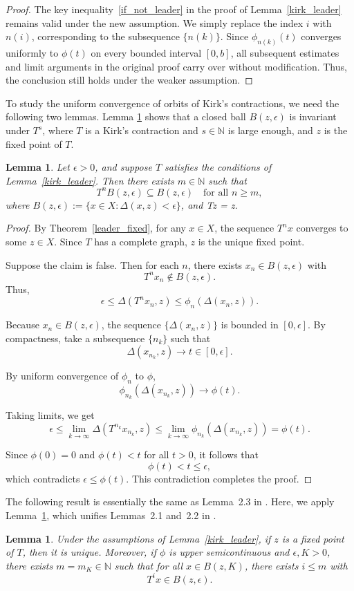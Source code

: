 \documentclass{birkjour}
\newtheorem{lem}[thm]{Lemma}
\theoremstyle{definition}
\theoremstyle{remark}
\numberwithin{equation}{section}
\begin{document}
\begin{proof}
The key inequality~\eqref{if_not_leader} in the proof of Lemma~\ref{kirk_leader} remains valid under the new assumption. We simply replace the index \(i\) with \(n(i)\), corresponding to the subsequence \(\{n(k)\}\). Since \(\phi_{n(k)}(t)\) converges uniformly to \(\phi(t)\) on every bounded interval \([0, b]\), all subsequent estimates and limit arguments in the original proof carry over without modification. Thus, the conclusion still holds under the weaker assumption.
\end{proof}

To study the uniform convergence of orbits of Kirk's contractions, we need the following two lemmas. Lemma \ref{invariant} shows that a closed ball $B(z,\epsilon)$ is invariant under  $T^{s}$, where $T$ is  a Kirk's contraction and $s\in \mathbb{N}$ is large enough, and $z$ is the fixed point of $T$.
\begin{lem}\label{invariant}
Let \(\epsilon > 0\), and suppose \(T\) satisfies the conditions of Lemma~\ref{kirk_leader}. Then there exists \(m \in \mathbb{N}\) such that
\[
T^{n} B(z, \epsilon) \subseteq B(z, \epsilon) \quad \text{for all } n \geq m,
\]
where \(B(z, \epsilon) := \{ x \in X : \Delta(x,z) < \epsilon \}\), and Tz = z.
\end{lem}

\begin{proof}
By Theorem~\ref{leader_fixed}, for any \(x \in X\), the sequence \(T^{n} x\) converges to some \(z \in X\). Since \(T\) has a complete graph, \(z\) is the unique fixed point.

Suppose the claim is false. Then for each \(n\), there exists \(x_n \in B(z, \epsilon)\) with
\[
T^{n} x_n \notin B(z, \epsilon).
\]
Thus,
\[
\epsilon \leq \Delta(T^{n} x_n, z) \leq \phi_n(\Delta(x_n, z)).
\]

Because \(x_n \in B(z, \epsilon)\), the sequence \(\{\Delta(x_n, z)\}\) is bounded in \([0, \epsilon]\). By compactness, take a subsequence \(\{n_k\}\) such that
\[
\Delta(x_{n_k}, z) \to t \in [0, \epsilon].
\]

By uniform convergence of \(\phi_n\) to \(\phi\),
\[
\phi_{n_k}(\Delta(x_{n_k}, z)) \to \phi(t).
\]

Taking limits, we get
\[
\epsilon \leq \lim_{k \to \infty} \Delta(T^{n_k} x_{n_k}, z) \leq \lim_{k \to \infty} \phi_{n_k}(\Delta(x_{n_k}, z)) = \phi(t).
\]

Since \(\phi(0) = 0\) and \(\phi(t) < t\) for all \(t > 0\), it follows that
\[
\phi(t) < t \leq \epsilon,
\]
which contradicts \(\epsilon \leq \phi(t)\). This contradiction completes the proof.
\end{proof}
The following result is essentially the same as Lemma~2.3 in \cite{arav2007}. Here, we apply Lemma~\ref{invariant}, which unifies Lemmas~2.1 and~2.2 in \cite{arav2007}.
\begin{lem}\label{retract}
Under the assumptions of Lemma~\ref{kirk_leader}, if \(z\) is a fixed point of \(T\), then it is unique. Moreover, if \(\phi\) is upper semicontinuous and \(\epsilon, K > 0\), there exists \(m = m_K \in \mathbb{N}\) such that for all \(x \in B(z, K)\), there exists \(i \leq m\) with
\[
T^{i} x \in B(z, \epsilon).
\]
\end{lem}
\end{document}
